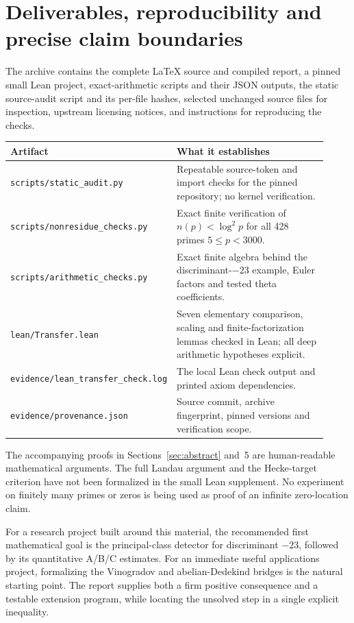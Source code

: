 \documentclass[11pt,letterpaper]{article}
\theoremstyle{definition}\newtheorem{definition}[theorem]{Definition}
\theoremstyle{remark}\newtheorem{remark}[theorem]{Remark}
\newcommand{\src}[1]{\nolinkurl{#1}}
\begin{document}
\section{Deliverables, reproducibility and precise claim boundaries}
The archive contains the complete \LaTeX{} source and compiled report, a pinned small Lean
project, exact-arithmetic scripts and their JSON outputs, the static source-audit script and
its per-file hashes, selected unchanged source files for inspection, upstream licensing notices,
and instructions for reproducing the checks.

\begin{center}\small
\begin{tabular}{p{0.31\linewidth}p{0.61\linewidth}}
\toprule
Artifact & What it establishes\\
\midrule
\src{scripts/static_audit.py} & Repeatable source-token and import checks for the pinned repository; no kernel verification.\\[4pt]
\src{scripts/nonresidue_checks.py} & Exact finite verification of $n(p)<\log^2p$ for all 428 primes $5\le p<3000$.\\[4pt]
\src{scripts/arithmetic_checks.py} & Exact finite algebra behind the discriminant-$-23$ example, Euler factors and tested theta coefficients.\\[4pt]
\src{lean/Transfer.lean} & Seven elementary comparison, scaling and finite-factorization lemmas checked in Lean; all deep arithmetic hypotheses explicit.\\[4pt]
\src{evidence/lean_transfer_check.log} & The local Lean check output and printed axiom dependencies.\\[4pt]
\src{evidence/provenance.json} & Source commit, archive fingerprint, pinned versions and verification scope.\\
\bottomrule
\end{tabular}
\end{center}

The accompanying proofs in Sections~\ref{sec:abstract} and~5 are human-readable mathematical
arguments. The full Landau argument and the Hecke-target criterion have not been formalized
in the small Lean supplement. No experiment on finitely many primes or zeros is being used
as proof of an infinite zero-location claim.

For a research project built around this material, the recommended first mathematical goal is
the principal-class detector for discriminant $-23$, followed by its quantitative A/B/C
estimates. For an immediate useful applications project, formalizing the Vinogradov and
abelian-Dedekind bridges is the natural starting point. The report supplies both a firm
positive consequence and a testable extension program, while locating the unsolved step
in a single explicit inequality.
\end{document}
